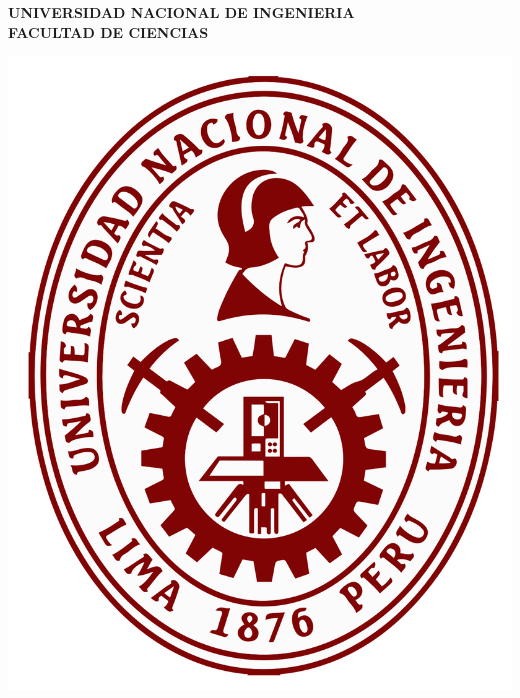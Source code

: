 \documentclass[a4paper,11pt]{article}
\begin{document}
	\begin{center}
		{\bf UNIVERSIDAD NACIONAL DE INGENIERIA\\
		FACULTAD DE CIENCIAS}
	\end{center}
	\begin{center}
		\includegraphics[scale=0.1]{uni.png}
	\end{center}		
\end{document}
